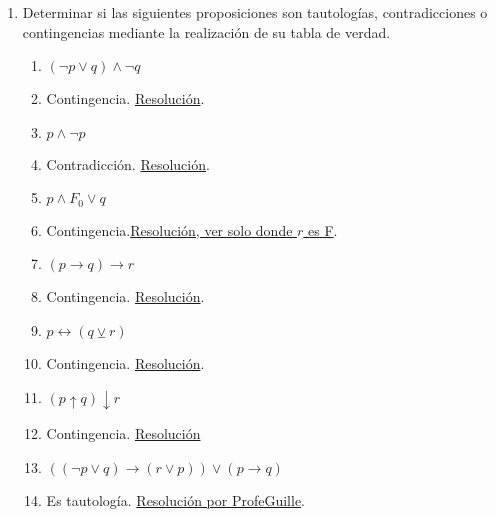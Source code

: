 \documentclass[a4paper]{article}
\newcommand{\answer}{\item[**]}
\newcommand{\exercise}{\item}
\newcommand{\then}{\to}
\newcommand{\eq}{\leftrightarrow}
\newcommand{\xor}{\veebar}
\newcommand{\nor}{\downarrow}
\newcommand{\nand}{\uparrow}
\begin{document}
\begin{enumerate}
\begin{multicols}{2}
\begin{enumerate} [label=(\alph*)]
		\item El pan no levará si le ponés mucha sal. Tampoco levará si lo dejás en un lugar frío. 
		\answer $(q\then \neg p)  \land  (r\then \neg p)$ con $p$:"\textit{El pan levará}", $q$:"\textit{Le pones mucha sal}" y $r$:"\textit{Lo dejas en un lugar frío}". Un equivalente es $(q \lor r) \then \neg p$:"\textit{Si le pones mucha sal o lo dejas en un lugar frío, el pan no levará}".

		\item Si te tomás el 324 te deja cerca de la UNQ, si te tomás el 65 no. 
		\answer $( p\then q ) \land ( r\then \neg q )$ con $p$:"\textit{Te tomas el 324}", $q$:"\textit{Te deja cerca de la UNQ}" y $p$:"\textit{Te tomás el 65}".  

	\end{enumerate}
	\end{multicols}


	\exercise Determinar si las siguientes proposiciones son tautologías, contradicciones o contingencias mediante la realización de su tabla de verdad. 
	\begin{multicols}{2}
	\begin{enumerate} [label=(\alph*)]
		\item $(\neg p \lor  q) \land  \neg q$
		\answer Contingencia. \href{https://www.wolframalpha.com/input?i=%28not+p+or+q%29+and+not+q}{Resolución}.

		\item $p \land  \neg p$
		\answer Contradicción. \href{https://www.wolframalpha.com/input?i=truth+table+of%3A+p+and+not+p}{Resolución}.

		\item $p \land  F_0 \lor  q$
		\answer Contingencia.\href{https://www.wolframalpha.com/input?i=p+and+r+or++q}{Resolución, ver solo donde $r$ es F}.

		\item $(p \then  q) \then  r$
		\answer Contingencia. \href{https://www.wolframalpha.com/input?i=%28p+%3D%3E+q%29+%3D%3E+r}{Resolución}.

		\item $p \eq (q \xor  r)$
		\answer Contingencia. \href{https://www.wolframalpha.com/input?i=p+%3C%3D%3E+%28q+xor++r%29}{Resolución}.

		\item $(p \nand q) \nor r$
		\answer Contingencia. \href{https://www.wolframalpha.com/input?i=%28p+nand+q%29+nor+r}{Resolución}

		\item $((\neg p \lor q) \then (r \lor p)) \lor (p \then q)$
		\answer Es tautología. \href{https://youtu.be/k-amMQR3oMc}{Resolución por ProfeGuille}.


\end{enumerate}
\end{multicols}
\end{enumerate}
\end{document}

